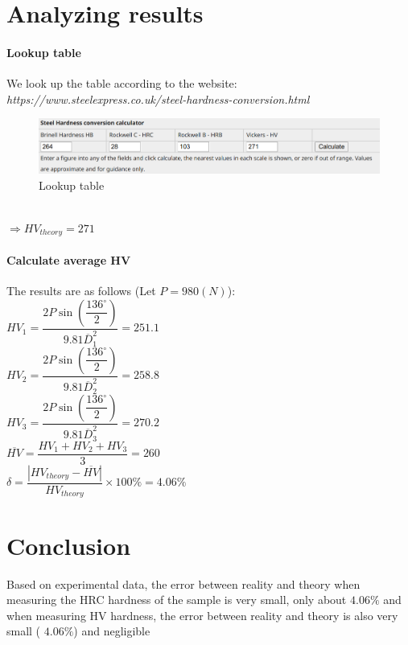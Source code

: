 \section{Analyzing results}

\paragraph{Lookup table} We look up the table according to the website:\\ \textit{https://www.steelexpress.co.uk/steel-hardness-conversion.html}
\begin{figure}[ht]
	\centering
	\includegraphics[width=150mm]{2020-07-19 14.08.38 oemmndcbldboiebfnladdacbdfmadadm cba70144e432.png}
	\caption{Lookup table}
	\label{2}
\end{figure}\\
$ \Rightarrow HV_{theory} = 271 $
\paragraph{Calculate average HV} The results are as follows (Let $ P=980\unit{(N)} $):\\
$ HV_1 = \dfrac{2P\sin\left(\dfrac{136^\circ}{2}\right)}{9.81\overline{D}_1^2} = 251.1 $\\
$ HV_2 = \dfrac{2P\sin\left(\dfrac{136^\circ}{2}\right)}{9.81\overline{D}_2^2} = 258.8 $\\
$ HV_3 = \dfrac{2P\sin\left(\dfrac{136^\circ}{2}\right)}{9.81\overline{D}_3^2} = 270.2 $\\
$ \overline{HV} = \dfrac{HV_1+HV_2+HV_3}{3} = 260 $\\
$ \delta = \dfrac{|HV_{theory}-\overline{HV}|}{HV_{theory}}\times100\% = 4.06\% $

\section{Conclusion}
Based on experimental data, the error between reality and theory when measuring the HRC hardness of the sample is very small, only about $ 4.06\% $ and when measuring HV hardness, the error between reality and theory is also very small ( $ 4.06\% $) and negligible
